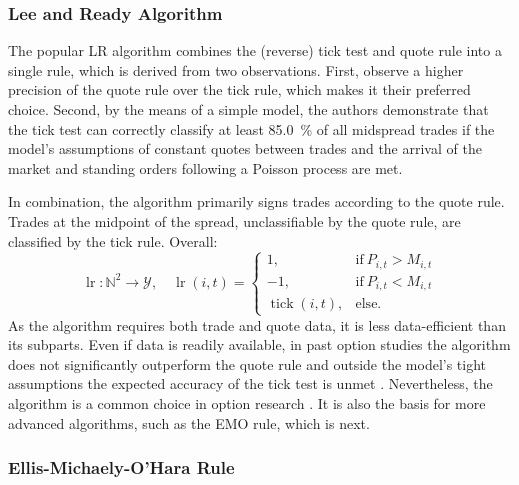 \subsubsection{Lee and Ready Algorithm}\label{sec:lee-and-ready-algorithm}

The popular \gls{LR} algorithm \autocite[][745]{leeInferringTradeDirection1991} combines the (reverse) tick test and quote rule into a single rule, which is derived from two observations. First, \textcite[][735--743]{leeInferringTradeDirection1991} observe a higher precision of the quote rule over the tick rule, which makes it their preferred choice. Second, by the means of a simple model, the authors demonstrate that the tick test can correctly classify at least \SI{85.0}{\percent} of all midspread trades if the model's assumptions of constant quotes between trades and the arrival of the market and standing orders following a Poisson process are met.

In combination, the algorithm primarily signs trades according to the quote rule. Trades at the midpoint of the spread, unclassifiable by the quote rule, are classified by the tick rule. Overall:
\begin{equation}
    \operatorname{lr} \colon \mathbb{N}^2 \to \mathcal{Y},\quad\operatorname{lr}(i,t)=
    \begin{cases}
        1,                         & \mathrm{if}\ P_{i, t} > M_{i, t} \\
        -1,                        & \mathrm{if}\ P_{i, t} < M_{i, t} \\
        \operatorname{tick}(i, t), & \mathrm{else}.
    \end{cases}
\end{equation}
As the algorithm requires both trade and quote data, it is less data-efficient than its subparts. Even if data is readily available, in past option studies the algorithm does not significantly outperform the quote rule and outside the model's tight assumptions the expected accuracy of the tick test is unmet \autocites[][30--32]{grauerOptionTradeClassification2022}[][886]{savickasInferringDirectionOption2003}. Nevertheless, the algorithm is a common choice in option research \autocite[cp.][453]{easleyOptionVolumeStock1998}. It is also the basis for more advanced algorithms, such as the \gls{EMO} rule, which is next.

\subsubsection{Ellis-Michaely-O'Hara
    Rule}\label{sec:ellis-michaely-ohara-rule}

